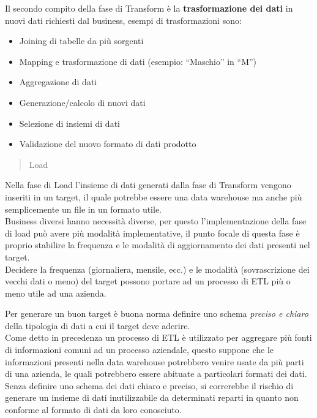 \documentclass[]{article}
\providecommand{\tightlist}{%
  \setlength{\itemsep}{0pt}\setlength{\parskip}{0pt}}
\begin{document}
Il secondo compito della fase di Transform è la \textbf{trasformazione
dei dati} in nuovi dati richiesti dal business, esempi di trasformazioni
sono:

\begin{itemize}
\tightlist
\item
  Joining di tabelle da più sorgenti
\item
  Mapping e trasformazione di dati (esempio: ``Maschio'' in ``M'')
\item
  Aggregazione di dati
\item
  Generazione/calcolo di nuovi dati
\item
  Selezione di insiemi di dati
\item
  Validazione del nuovo formato di dati prodotto
\end{itemize}

\begin{quote}
Load
\end{quote}

Nella fase di Load l'insieme di dati generati dalla fase di Transform
vengono inseriti in un target, il quale potrebbe essere una data
warehouse ma anche più semplicemente un file in un formato utile.\\
Business diversi hanno necessità diverse, per questo l'implementazione
della fase di load può avere più modalità implementative, il punto
focale di questa fase è proprio stabilire la frequenza e le modalità di
aggiornamento dei dati presenti nel target.\\
Decidere la frequenza (giornaliera, mensile, ecc.) e le modalità
(sovrascrizione dei vecchi dati o meno) del target possono portare ad un
processo di ETL più o meno utile ad una azienda.

Per generare un buon target è buona norma definire uno schema
\emph{preciso e chiaro} della tipologia di dati a cui il target deve
aderire.\\
Come detto in precedenza un processo di ETL è utilizzato per aggregare
più fonti di informazioni comuni ad un processo aziendale, questo
suppone che le informazioni presenti nella data warehouse potrebbero
venire usate da più parti di una azienda, le quali potrebbero essere
abituate a particolari formati dei dati.\\
Senza definire uno schema dei dati chiaro e preciso, si correrebbe il
rischio di generare un insieme di dati inutilizzabile da determinati
reparti in quanto non conforme al formato di dati da loro conosciuto.

\newpage
\end{document}
